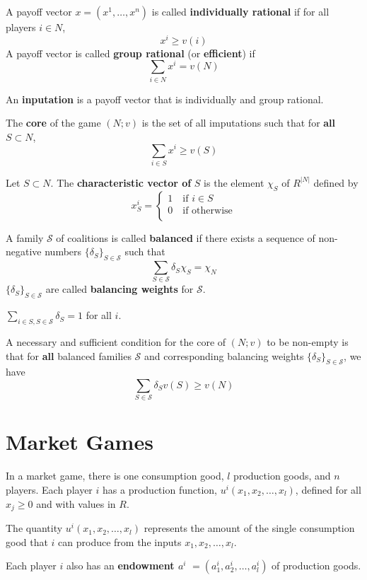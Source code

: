 \documentclass[11pt,a4paper]{article}
\newcommand{\note}[1]{%
    \begin{tcolorbox}[title=\textbf{Note},fonttitle=\bfseries,coltitle=textgray]
        #1
    \end{tcolorbox}
}
\begin{document}
A payoff vector $x = (x^1, \dots, x^n)$ is called \textbf{individually rational} if for all players $i \in N$,
\[
x^i \geqslant v(i)
\]
A payoff vector is called \textbf{group rational} (or \textbf{efficient}) if
\[
\sum_{i \in N} x^i = v(N)
\]

An \textbf{inputation} is a payoff vector that is individually and group rational.

The \textbf{core} of the game $(N; v)$ is the set of all imputations such that for \textbf{all} $S \subset N$,
\[
\sum_{i \in S} x^i \geqslant v(S)
\]

Let $S \subset N$. The \textbf{characteristic vector of} $S$ is the element $\chi_S$ of $R^{|N|}$ defined by
\[
x^i_S = 
\begin{cases}
    1 \quad \text{if } i \in S \\
    0 \quad \text{if otherwise} \\
\end{cases}
\]

A family $\mathcal{S}$ of coalitions is called \textbf{balanced} if there exists a sequence of non-negative numbers $\{\delta_S\}_{S \in \mathcal{S}}$ such that
\[
\sum_{S \in \mathcal{S}} \delta_S \chi_S = \chi_N
\]
$\{\delta_S\}_{S \in \mathcal{S}}$ are called \textbf{balancing weights} for $\mathcal{S}$. \par
\note{$\sum_{i \in S, S \in \mathcal{S}} \delta_S = 1$ for all $i$.}

A necessary and sufficient condition for the core of $(N; v)$ to be non-empty is that for \textbf{all} balanced families $\mathcal{S}$ and corresponding balancing weights $\{\delta_S\}_{S \in \mathcal{S}}$, we have 
\[
\sum_{S \in \mathcal{S}} \delta_S v(S) \geqslant v(N)
\]

\section{Market Games}
In a market game, there is one consumption good, $l$ production goods, and $n$ players. Each player $i$ has a production function, $u^i(x_1, x_2, \dots, x_l)$, defined for all $x_j \geqslant 0$ and with values in $R$.  \par

The quantity $u^i(x_1, x_2, \dots, x_l)$ represents the amount of the single consumption good that $i$ can produce from the inputs $x_1, x_2, \dots, x_l$.

Each player $i$ also has an \textbf{endowment $a^i$} $ = (a_1^i, a_2^i, \dots, a_l^i)$ of production goods.
\end{document}
